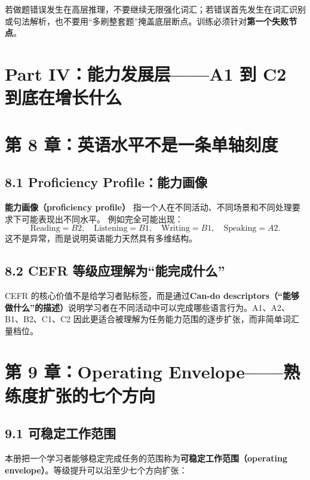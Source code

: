 \documentclass[11pt,a4paper]{ctexart}
\newcommand{\kw}[1]{\textbf{#1}}
\newcommand{\term}[2]{\textbf{#1（#2）}}
\begin{document}
\begin{exam}[训练判断]
若做题错误发生在高层推理，不要继续无限强化词汇；若错误首先发生在词汇识别或句法解析，也不要用“多刷整套题”掩盖底层断点。训练必须针对\kw{第一个失败节点}。
\end{exam}

\newpage
\section{Part IV：能力发展层——A1 到 C2 到底在增长什么}

\section{第 8 章：英语水平不是一条单轴刻度}

\subsection{8.1 Proficiency Profile：能力画像}
\term{能力画像}{proficiency profile} 指一个人在不同活动、不同场景和不同处理要求下可能表现出不同水平。
例如完全可能出现：
\[
\text{Reading}=B2,
\quad
\text{Listening}=B1,
\quad
\text{Writing}=B1,
\quad
\text{Speaking}=A2.
\]
这不是异常，而是说明英语能力天然具有多维结构。

\subsection{8.2 CEFR 等级应理解为“能完成什么”}
CEFR 的核心价值不是给学习者贴标签，而是通过\term{Can-do descriptors}{“能够做什么”的描述}说明学习者在不同活动中可以完成哪些语言行为。A1、A2、B1、B2、C1、C2 因此更适合被理解为任务能力范围的逐步扩张，而非简单词汇量档位。

\section{第 9 章：Operating Envelope——熟练度扩张的七个方向}

\subsection{9.1 可稳定工作范围}
本册把一个学习者能够稳定完成任务的范围称为\term{可稳定工作范围}{operating envelope}。等级提升可以沿至少七个方向扩张：
\end{document}
